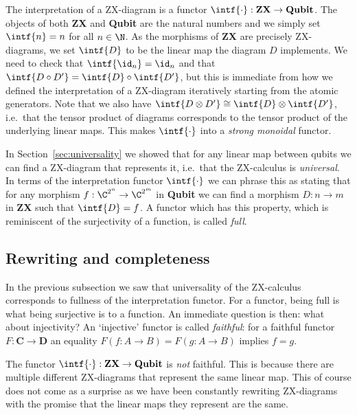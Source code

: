 \documentclass[a4paper,onecolumn,superscriptaddress,11pt,%
				unpublished,%
				allowfontchageintitle,%
				]{quantumarticle}
\begin{document}
The interpretation of a ZX-diagram is a functor $\intf{\cdot}:\textbf{ZX}\rightarrow \textbf{Qubit}$. The objects of both \textbf{ZX} and \textbf{Qubit} are the natural numbers and we simply set $\intf{n} = n$ for all $n\in \N$. As the morphisms of \textbf{ZX} are precisely ZX-diagrams, we set $\intf{D}$ to be the linear map the diagram $D$ implements. 
We need to check that $\intf{\id_n} = \id_n$ and that $\intf{D\circ D'} = \intf{D}\circ \intf{D'}$, but this is immediate from how we defined the interpretation of a ZX-diagram iteratively starting from the atomic generators. 
Note that we also have $\intf{D\otimes D'} \cong \intf{D}\otimes \intf{D'}$, i.e.~that the tensor product of diagrams corresponds to the tensor product of the underlying linear maps. This makes $\intf{\cdot}$ into a \emph{strong monoidal} functor.

In Section~\ref{sec:universality} we showed that for any linear map between qubits we can find a ZX-diagram that represents it, i.e.~that the ZX-calculus is \emph{universal}. In terms of the interpretation functor $\intf{\cdot}$ we can phrase this as stating that for any morphism $f:\C^{2^n}\rightarrow \C^{2^m}$ in \textbf{Qubit} we can find a morphism $D:n\rightarrow m$ in \textbf{ZX} such that $\intf{D} = f$. A functor which has this property, which is reminiscent of the surjectivity of a function, is called \emph{full}.

\subsection{Rewriting and completeness}

In the previous subsection we saw that universality of the ZX-calculus corresponds to fullness of the interpretation functor. For a functor, being full is what being surjective is to a function. An immediate question is then: what about injectivity?
An `injective' functor is called \emph{faithful}: for a faithful functor $F:\textbf{C}\rightarrow \textbf{D}$ an equality $F(f:A\rightarrow B)=F(g:A\rightarrow B)$ implies $f=g$.

The functor $\intf{\cdot}:\textbf{ZX}\rightarrow \textbf{Qubit}$ is \emph{not} faithful. This is because there are multiple different ZX-diagrams that represent the same linear map. This of course does not come as a surprise as we have been constantly rewriting ZX-diagrams with the promise that the linear maps they represent are the same.
\end{document}
